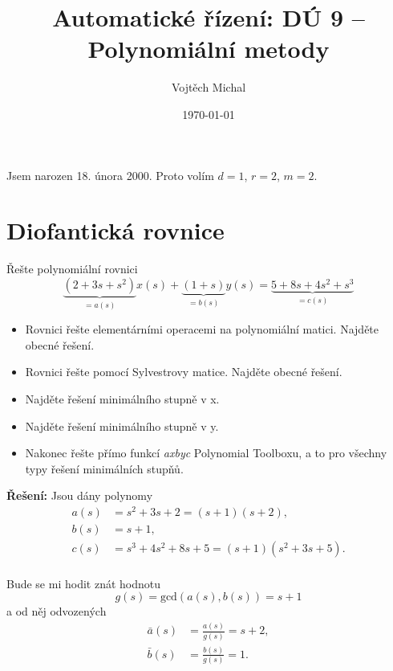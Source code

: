 \documentclass[twoside]{article}
\title{Automatické řízení: DÚ 9 -- Polynomiální metody}
\author{Vojtěch Michal}
\date{\today}
\begin{document}
\maketitle

Jsem narozen 18. února 2000. Proto volím $d = 1$, $r = 2$, $m = 2$.

\section{Diofantická rovnice}

Řešte polynomiální rovnici
\begin{equation}
	\label{eq:zadani}
	\underbrace{(2 + 3s + s^2)}_{=a(s)}x(s) + \underbrace{(1 + s)}_{=b(s)}y(s) = \underbrace{5 + 8s + 4s^2 + s^3}_{=c(s)}
\end{equation}
\begin{itemize}
	\item Rovnici řešte elementárními operacemi na polynomiální matici. Najděte obecné řešení.
	\item Rovnici řešte pomocí Sylvestrovy matice. Najděte obecné řešení.
	\item Najděte řešení minimálního stupně v x.
	\item Najděte řešení minimálního stupně v y.
	\item Nakonec řešte přímo funkcí \textit{axbyc} Polynomial Toolboxu, a to pro všechny typy řešení
	minimálních stupňů.
\end{itemize}

\textbf{Řešení:}
Jsou dány polynomy
\begin{equation}
	\begin{aligned}
		a(s) &= s^2 + 3s + 2 = (s+1)(s+2), \\
		b(s) &= s + 1, \\
		c(s) &= s^3 + 4s^2 + 8s + 5 = (s+1)(s^2 + 3s + 5).
	\end{aligned}
\end{equation} \\
Bude se mi hodit znát hodnotu
\begin{equation}
	g(s) = \text{gcd}(a(s), b(s)) = s + 1
\end{equation}
a od něj odvozených
\begin{equation}
	\label{eq:bar_poly}
	\begin{aligned}
		\bar{a}(s) &= \frac{a(s)}{g(s)} = s + 2, \\
		\bar{b}(s) &= \frac{b(s)}{g(s)} = 1. \\
	\end{aligned}
\end{equation}
\end{document}
